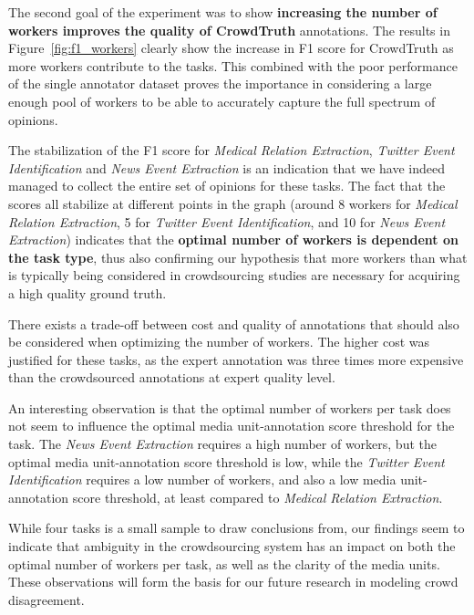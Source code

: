 {The second goal of the experiment was to show \textbf{increasing the number of workers improves the quality of CrowdTruth} annotations.  The results in Figure~\ref{fig:f1_workers} clearly show the increase in F1 score for CrowdTruth as more workers contribute to the tasks. This combined with the poor performance of the single annotator dataset proves the importance in considering a large enough pool of workers to be able to accurately capture the full spectrum of opinions.

The stabilization of the F1 score for \textit{Medical Relation Extraction}, \textit{Twitter Event Identification} and \textit{News Event Extraction} is an indication that we have indeed managed to collect the entire set of opinions for these tasks.  The fact that the scores all stabilize at different points in the graph (around 8 workers for \textit{Medical Relation Extraction}, 5 for \textit{Twitter Event Identification}, and 10 for \textit{News Event Extraction}) indicates that the \textbf{optimal number of workers is dependent on the task type}, thus also confirming our hypothesis that more workers than what is typically being considered in crowdsourcing studies are necessary for acquiring a high quality ground truth.

There exists a trade-off between cost and quality of annotations that should also be considered when optimizing the number of workers.  The higher cost was justified for these tasks, as the expert annotation was three times more expensive than the crowdsourced annotations at expert quality level.

An interesting observation is that the optimal number of workers per task does not seem to influence the optimal media unit-annotation score threshold for the task.  The \textit{News Event Extraction} requires a high number of workers, but the optimal media unit-annotation score threshold is low, while the \textit{Twitter Event Identification} requires a low number of workers, and also a low media unit-annotation score threshold, at least compared to \textit{Medical Relation Extraction}. 

While four tasks is a small sample to draw conclusions from, our findings seem to indicate that ambiguity in the crowdsourcing system has an impact on both the optimal number of workers per task, as well as the clarity of the media units.  These observations will form the basis for our future research in modeling crowd disagreement.

}
